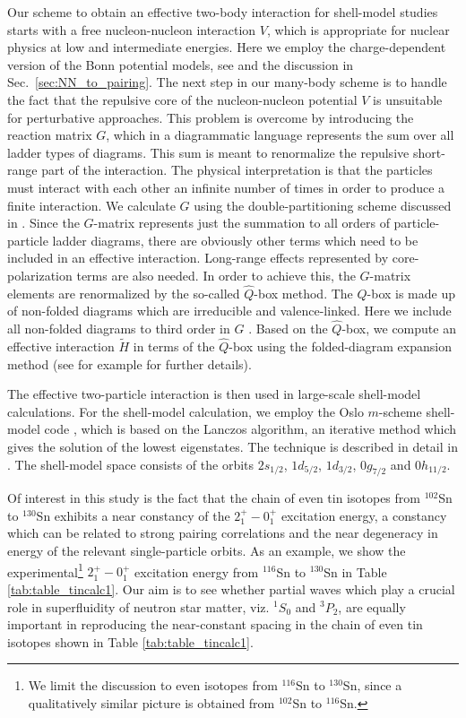 \documentclass[rmp,aps,floatfix]{revtex4}
\begin{document}
Our scheme to obtain an effective two-body interaction for 
shell-model studies
starts with a free nucleon-nucleon  interaction $V$, which is
appropriate for nuclear physics at low and intermediate energies. 
Here we employ the charge-dependent
version of the Bonn potential models, 
see \cite{bonn-cd} and the discussion in Sec.~\ref{sec:NN_to_pairing}.
The next step 
in our many-body scheme is to handle 
the fact that the repulsive core of the nucleon-nucleon potential $V$
is unsuitable for perturbative approaches. This problem is overcome
by introducing the reaction matrix $G$, which in 
a diagrammatic language represents  the sum over all
ladder types of diagrams. This sum is meant to renormalize
the repulsive short-range part of the interaction. The physical interpretation
is that the particles must interact with each other an infinite number
of times in order to produce a finite interaction. 
We calculate $G$ using the double-partitioning scheme discussed
in \cite{mhj_95}.
Since the $G$-matrix represents just
the summation to all orders of particle-particle
ladder diagrams, there are obviously other terms which need to be included
in an effective interaction. Long-range effects represented by 
core-polarization terms are also needed.
In order to achieve this,  the $G$-matrix elements
are renormalized by the so-called $\hat{Q}$-box method.
The $\hat{Q}$-box is made up of non-folded diagrams which are irreducible
and valence-linked. Here we include all non-folded diagrams to third
order in $G$ \cite{mhj_95}.
Based on the $\hat{Q}$-box, we compute 
an effective interaction
$\tilde{H}$ in terms of the $\hat{Q}$-box
 using the folded-diagram expansion method
(see for example   \cite{mhj_95} for further details).


The effective two-particle interaction is then used in 
large-scale shell-model
calculations.
For the shell-model calculation, we employ the Oslo $m$-scheme 
shell-model code
\cite{eh2002}, which is based
on the Lanczos algorithm, an iterative method which gives the solution of
the lowest eigenstates. 
The technique is described in detail in  \cite{whit77}. 
The shell-model space consists of the orbits 
$2s_{1/2}$, $1d_{5/2}$, $1d_{3/2}$, $0g_{7/2}$ and $0h_{11/2}$.

Of interest in this study is the fact that 
the chain of even tin isotopes from $^{102}$Sn to $^{130}$Sn 
exhibits a near constancy of the 
$2^+_1-0^+_1$ excitation energy, a constancy which can be related
to strong pairing correlations and the near degeneracy in energy 
of the relevant single-particle orbits. As an example, we show the 
experimental\footnote{We limit the discussion to even isotopes
from  $^{116}$Sn to $^{130}$Sn, since a qualitatively similar picture
is obtained from $^{102}$Sn to $^{116}$Sn.}
$2^+_1-0^+_1$ excitation energy 
from  $^{116}$Sn to $^{130}$Sn in Table \ref{tab:table_tincalc1}. 
Our aim is to see whether partial waves which play a crucial
role in superfluidity of neutron star matter, 
viz. $^1S_0$ and $^3P_2$, are equally
important in reproducing the near-constant spacing in the chain
of even tin isotopes shown in  Table \ref{tab:table_tincalc1}. 
\end{document}
